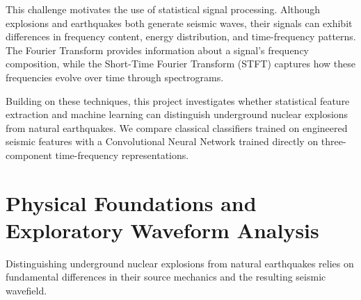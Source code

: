 \documentclass[11pt,a4paper]{article}
\begin{document}
This challenge motivates the use of statistical signal processing. Although explosions and earthquakes both generate seismic waves, their signals can exhibit differences in frequency content, energy distribution, and time-frequency patterns. The Fourier Transform \cite{cooley1965} provides information about a signal's frequency composition, while the Short-Time Fourier Transform (STFT) captures how these frequencies evolve over time through spectrograms.

Building on these techniques, this project investigates whether statistical feature extraction and machine learning can distinguish underground nuclear explosions from natural earthquakes. We compare classical classifiers trained on engineered seismic features with a Convolutional Neural Network trained directly on three-component time-frequency representations.


\section{Physical Foundations and Exploratory Waveform Analysis}
Distinguishing underground nuclear explosions from natural earthquakes relies on fundamental differences in their source mechanics and the resulting seismic wavefield.
\end{document}
